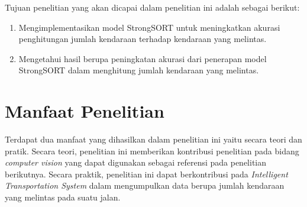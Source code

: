 Tujuan penelitian yang akan dicapai dalam penelitian ini adalah sebagai berikut:
\begin{enumerate}
    \item Mengimplementasikan model StrongSORT untuk meningkatkan akurasi penghitungan jumlah kendaraan terhadap kendaraan yang melintas.
    \item Mengetahui hasil berupa peningkatan akurasi dari penerapan model StrongSORT dalam menghitung jumlah kendaraan yang melintas.
\end{enumerate}

\section{Manfaat Penelitian}
Terdapat dua manfaat yang dihasilkan dalam penelitian ini yaitu secara teori dan pratik. Secara teori, penelitian ini memberikan kontribusi penelitian pada bidang \emph{computer vision} yang dapat digunakan sebagai referensi pada penelitian berikutnya. Secara praktik, penelitian ini dapat berkontribusi pada \emph{Intelligent Transportation System} dalam mengumpulkan data berupa jumlah kendaraan yang melintas pada suatu jalan.
\newpage 